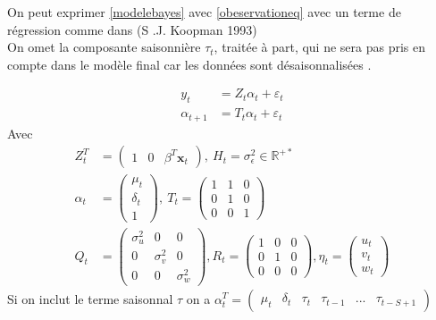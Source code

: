 \documentclass{article}
\theoremstyle{definition}
\theoremstyle{remark}
\begin{document}
{On peut exprimer \ref{modelebayes} avec \ref{obeservationeq} avec un terme de régression comme dans \cite{kapman1993} 
(S .J. Koopman 1993) \\
On omet la composante saisonnière $\tau_{t}$, traitée à part, qui ne sera pas pris en compte dans le modèle final car les données sont 
\og désaisonnalisées \fg{}.

\begin{equation}
\begin{aligned} y_{t} &= Z_{t} \alpha_{t}+ \varepsilon_{t}\\ 
\alpha_{t+1} &= T_{t} \alpha_{t}+ \varepsilon_{t}
\end{aligned}
\end{equation}
Avec 
\[
\begin{aligned}
	Z_{t}^{T} &= (\begin{array}{lll}{1} & {0} & {\beta^{T} \mathbf{x}_{t}}\end{array}), \
	H_t = \sigma_{\epsilon}^{2} \in \mathbb{R}^{+*} \\
\alpha_{t} &= \left(\begin{array}{c}{\mu_{t}} \\ {\delta_{t}} \\ {1}\end{array}\right) , \
T_t = \left(\begin{array}{lll}{1} & {1} & {0} \\ {0} & {1} & {0} \\ {0} & {0} & {1}\end{array}\right) \\
Q_t &= \left(
	\begin{array}{lll}{
		\sigma_{u}^{2}} & {0} & {0} \\
		 {0} & {\sigma_{v}^{2}} & {0} \\
		  {0} & {0} & {\sigma_{w}^{2}}
	\end{array}
	\right), 
R_{t} = \left(\begin{array}{lll}{1} & {0} & {0} \\ {0} & {1} & {0} \\ {0} & {0} & {0}\end{array}\right),
\eta_{t} = \left(\begin{array}{c}{u_{t}} \\ {v_{t}} \\ {w_t}\end{array}\right)
\end{aligned}
\]
Si on inclut le terme saisonnal $\tau$ on a 
$\alpha_{t}^{T} = (\begin{array}{llllll}{\mu_{t}} & {\delta_{t}} & {\tau_{t}} & {\tau_{t-1}} & ...&  {\tau_{t-S+1}}\end{array})$

}
\end{document}
